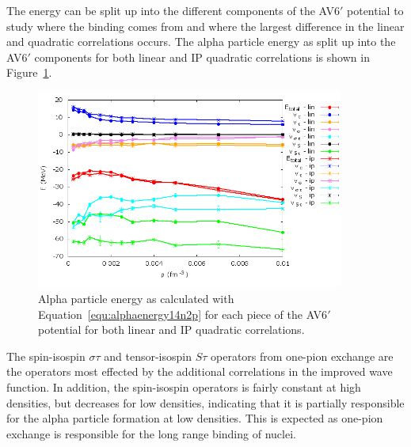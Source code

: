 The energy can be split up into the different components of the AV6$'$ potential to study where the binding comes from and where the largest difference in the linear and quadratic correlations occurs. The alpha particle energy as split up into the AV6$'$ components for both linear and IP quadratic correlations is shown in Figure~\ref{fig:av6_alpha}.
\begin{figure}[h!]
   \centering
   \includegraphics[width=0.9\textwidth]{figures/av6_alpha.png}
   \caption{Alpha particle energy as calculated with Equation~\ref{equ:alphaenergy14n2p} for each piece of the AV6$'$ potential for both linear and IP quadratic correlations.}
   \label{fig:av6_alpha}
\end{figure}
The spin-isospin $\sigma\tau$ and tensor-isospin $S\tau$ operators from one-pion exchange are the operators most effected by the additional correlations in the improved wave function. In addition, the spin-isospin operators is fairly constant at high densities, but decreases for low densities, indicating that it is partially responsible for the alpha particle formation at low densities. This is expected as one-pion exchange is responsible for the long range binding of nuclei.
